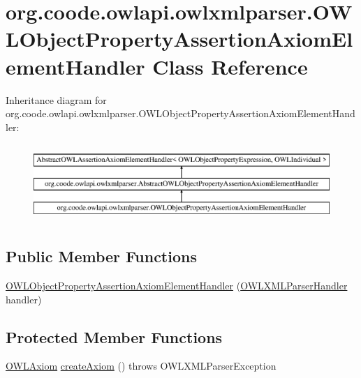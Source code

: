 \hypertarget{classorg_1_1coode_1_1owlapi_1_1owlxmlparser_1_1_o_w_l_object_property_assertion_axiom_element_handler}{\section{org.\-coode.\-owlapi.\-owlxmlparser.\-O\-W\-L\-Object\-Property\-Assertion\-Axiom\-Element\-Handler Class Reference}
\label{classorg_1_1coode_1_1owlapi_1_1owlxmlparser_1_1_o_w_l_object_property_assertion_axiom_element_handler}
}
Inheritance diagram for org.\-coode.\-owlapi.\-owlxmlparser.\-O\-W\-L\-Object\-Property\-Assertion\-Axiom\-Element\-Handler\-:\begin{figure}[H]
\begin{center}
\leavevmode
\includegraphics[height=2.989324cm]{classorg_1_1coode_1_1owlapi_1_1owlxmlparser_1_1_o_w_l_object_property_assertion_axiom_element_handler}
\end{center}
\end{figure}
\subsection*{Public Member Functions}
\begin{DoxyCompactItemize}
\item 
\hyperlink{classorg_1_1coode_1_1owlapi_1_1owlxmlparser_1_1_o_w_l_object_property_assertion_axiom_element_handler_a9653c86646570fb0c3259d4eacab9eb3}{O\-W\-L\-Object\-Property\-Assertion\-Axiom\-Element\-Handler} (\hyperlink{classorg_1_1coode_1_1owlapi_1_1owlxmlparser_1_1_o_w_l_x_m_l_parser_handler}{O\-W\-L\-X\-M\-L\-Parser\-Handler} handler)
\end{DoxyCompactItemize}
\subsection*{Protected Member Functions}
\begin{DoxyCompactItemize}
\item 
\hyperlink{interfaceorg_1_1semanticweb_1_1owlapi_1_1model_1_1_o_w_l_axiom}{O\-W\-L\-Axiom} \hyperlink{classorg_1_1coode_1_1owlapi_1_1owlxmlparser_1_1_o_w_l_object_property_assertion_axiom_element_handler_a9e1fa5de89db1af892dbbde0af7b1af2}{create\-Axiom} ()  throws O\-W\-L\-X\-M\-L\-Parser\-Exception 
\end{DoxyCompactItemize}


